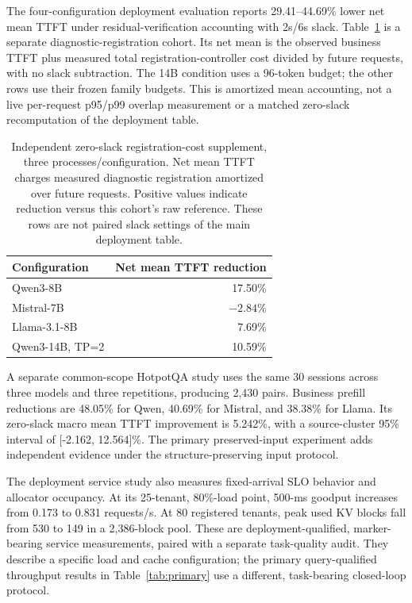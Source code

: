 The four-configuration deployment evaluation reports 29.41--44.69\% lower net mean TTFT under residual-verification accounting with 2s/6s slack. Table~\ref{tab:zeroslack} is a separate diagnostic-registration cohort. Its net mean is the observed business TTFT plus measured total registration-controller cost divided by future requests, with no slack subtraction. The 14B condition uses a 96-token budget; the other rows use their frozen family budgets. This is amortized mean accounting, not a live per-request p95/p99 overlap measurement or a matched zero-slack recomputation of the deployment table.

\begin{table}[t]
\centering\small
\caption{Independent zero-slack registration-cost supplement, three processes/configuration. Net mean TTFT charges measured diagnostic registration amortized over future requests. Positive values indicate reduction versus this cohort's raw reference. These rows are not paired slack settings of the main deployment table.}
\label{tab:zeroslack}
\begin{tabular}{@{}lr@{}}
\toprule
Configuration & Net mean TTFT reduction\\
\midrule
Qwen3-8B & 17.50\%\\
Mistral-7B & $-2.84$\%\\
Llama-3.1-8B & 7.69\%\\
Qwen3-14B, TP=2 & 10.59\%\\
\bottomrule
\end{tabular}
\end{table}

A separate common-scope HotpotQA study uses the same 30 sessions across three models and three repetitions, producing 2,430 pairs. Business prefill reductions are 48.05\% for Qwen, 40.69\% for Mistral, and 38.38\% for Llama. Its zero-slack macro mean TTFT improvement is 5.242\%, with a source-cluster 95\% interval of [-2.162, 12.564]\%. The primary preserved-input experiment adds independent evidence under the structure-preserving input protocol.

The deployment service study also measures fixed-arrival SLO behavior and allocator occupancy. At its 25-tenant, 80\%-load point, 500-ms goodput increases from 0.173 to 0.831 requests/s. At 80 registered tenants, peak used KV blocks fall from 530 to 149 in a 2,386-block pool. These are deployment-qualified, marker-bearing service measurements, paired with a separate task-quality audit. They describe a specific load and cache configuration; the primary query-qualified throughput results in Table~\ref{tab:primary} use a different, task-bearing closed-loop protocol.

